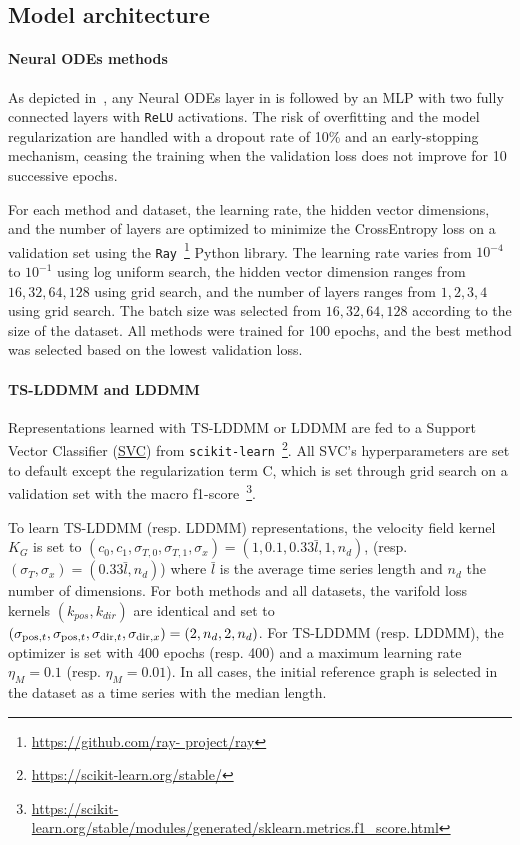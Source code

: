 \subsection{Model architecture}

\paragraph{Neural ODEs methods}
As depicted in~\cite{oh2024stable}, any Neural ODEs layer in  is followed by an MLP with two fully connected layers with \texttt{ReLU} activations. The risk of overfitting and the model regularization are handled with a dropout rate of 10\% and an early-stopping mechanism, ceasing the training when the validation loss does not improve for 10 successive epochs. 

For each method and dataset, the learning rate, the hidden vector dimensions, and the number of layers are optimized to minimize the CrossEntropy loss on a validation set using the \texttt{Ray}~\footnote{\url{https://github.com/ray- project/ray}} Python library. 
The learning rate varies from $10^{-4}$ to $10^{-1}$ using log uniform search, the hidden vector dimension ranges from ${16, 32, 64, 128}$ using grid search, and the number of layers ranges from ${1, 2, 3, 4}$ using grid search. The batch size was selected from ${16, 32, 64, 128}$ according to the size of the dataset. All methods were trained for 100 epochs, and the best method was selected based on the lowest validation loss. 

\paragraph{TS-LDDMM and LDDMM}
Representations learned with TS-LDDMM or LDDMM are fed to a Support Vector Classifier (\href{https://scikit-learn.org/stable/modules/generated/sklearn.svm.SVC.html#sklearn.svm.SVC}{SVC}) from \texttt{scikit-learn}~\footnote{\url{https://scikit-learn.org/stable/}}. All SVC's hyperparameters are set to default except the regularization term C, which is set through grid search on a validation set with the macro f1-score~\footnote{\url{https://scikit-learn.org/stable/modules/generated/sklearn.metrics.f1_score.html}}. 

To learn TS-LDDMM (resp. LDDMM) representations, the velocity field kernel $K_G$ is set to $ (c_0,c_1,\sigma_{T,0},\sigma_{T,1},\sigma_x) = (1,0.1,0.33\bar{l},1,n_d)$, (resp. $ (\sigma_{T},\sigma_x) = (0.33\bar{l},n_d)$) where $\bar{l}$ is the average time series length and $n_d$ the number of dimensions. For both methods and all datasets, the varifold loss kernels $(k_{pos},k_{dir})$ are identical and set to $(\sigma_{\mathrm{pos},t}, \sigma_{\mathrm{pos},t}, \sigma_{\mathrm{dir},t}, \sigma_{\mathrm{dir},x}) = (2,n_d,2,n_d)$. For TS-LDDMM (resp. LDDMM), the optimizer is set with 400 epochs (resp. 400) and a maximum learning rate $\eta_M = 0.1$ (resp. $\eta_M = 0.01$). In all cases, the initial reference graph is selected in the dataset as a time series with the median length.


